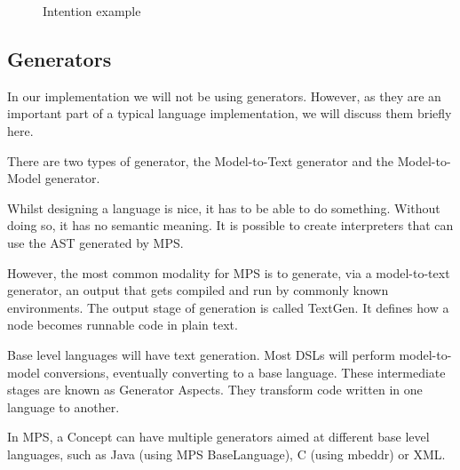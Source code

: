 \begin{figure}
    \centering
    \caption{Intention example}
    \label{fig:intention_example}
\end{figure}

\subsection{Generators}
In our implementation we will not be using generators.
However, as they are an important part of a typical language implementation, we will discuss them briefly here.

There are two types of generator, the Model-to-Text generator and the Model-to-Model generator.

Whilst designing a language is nice, it has to be able to do something. 
Without doing so, it has no semantic meaning.
It is possible to create interpreters that can use the AST generated by MPS.

However, the most common modality for MPS is to generate, via a model-to-text generator, an output that gets compiled and run by commonly known environments.
The output stage of generation is called TextGen.
It defines how a node becomes runnable code in plain text.

Base level languages will have text generation.
Most DSLs will perform model-to-model conversions, eventually converting to a base language.
These intermediate stages are known as Generator Aspects.
They transform code written in one language to another.

In MPS, a Concept can have multiple generators aimed at different base level languages, such as Java (using MPS BaseLanguage), C (using mbeddr) or XML.